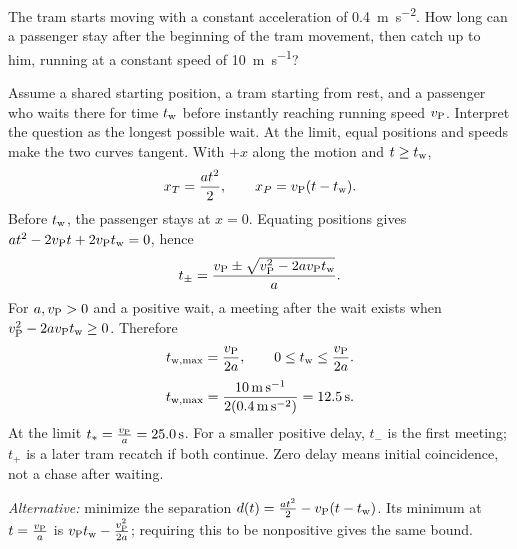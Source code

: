 \quiznextproblem
\begin{problem}[25 pts]
The tram starts moving with a constant acceleration of
\qty{0.4}{\metre\per\second\squared}. How long can a passenger stay after
the beginning of the tram movement, then catch up to him, running at a
constant speed of \qty{10}{\metre\per\second}?
\end{problem}
\begin{solution}
Assume a shared starting position, a tram starting from rest, and a
passenger who waits there for time $t_{\rm w}$ before instantly reaching running
speed $v_{\rm P}$. Interpret the question as the longest possible wait.
At the limit, equal positions and speeds make the two curves tangent.
With $+x$ along the motion and $t\geq t_{\rm w}$,
\[
x_T=\frac{at^2}{2},\qquad x_P=v_{\rm P}(t-t_{\rm w}).
\]
Before $t_{\rm w}$, the passenger stays at $x=0$.
Equating positions gives $at^2-2v_{\rm P}t+2v_{\rm P}t_{\rm w}=0$, hence
\[
t_\pm=\frac{v_{\rm P}\pm\sqrt{v_{\rm P}^2-2av_{\rm P}t_{\rm w}}}{a}.
\]
For $a,v_{\rm P}>0$ and a positive wait, a meeting after the wait exists when
$v_{\rm P}^2-2av_{\rm P}t_{\rm w}\geq0$. Therefore
\[
t_{\rm w,max}=\frac{v_{\rm P}}{2a},\qquad 0\leq t_{\rm w}\leq\frac{v_{\rm P}}{2a}.
\]
\[
t_{\rm w,max}=\frac{\qty{10}{\metre\per\second}}
{2(\qty{0.4}{\metre\per\second\squared})}=\qty{12.5}{\second}.
\]
At the limit $t_*=\frac{v_{\rm P}}{a}=\qty{25.0}{\second}$.
For a smaller positive delay, $t_-$ is the first meeting; $t_+$ is a
later tram recatch if both continue. Zero delay means initial coincidence,
not a chase after waiting.

\textit{Alternative:} minimize the separation
$d(t)=\frac{at^2}{2}-v_{\rm P}(t-t_{\rm w})$.
Its minimum at $t=\frac{v_{\rm P}}{a}$ is $v_{\rm P}t_{\rm w}-\frac{v_{\rm P}^2}{2a}$;
requiring this to be nonpositive gives the same bound.
\end{solution}

